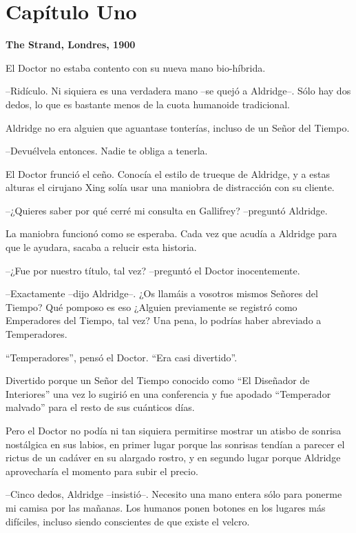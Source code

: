 \chapter*{Capítulo Uno}

\textbf{\large{The Strand, Londres, 1900}}

\mbox{}

El Doctor no estaba contento con su nueva mano bio-híbrida.

--Ridículo. Ni siquiera es una verdadera mano --se quejó a Aldridge--. Sólo hay dos dedos, lo que es bastante menos de la cuota humanoide tradicional.

Aldridge no era alguien que aguantase tonterías, incluso de un Señor del Tiempo.

--Devuélvela entonces. Nadie te obliga a tenerla.

El Doctor frunció el ceño. Conocía el estilo de trueque de Aldridge, y a estas alturas el cirujano Xing solía usar una maniobra de distracción con su cliente. 

--¿Quieres saber por qué cerré mi consulta en Gallifrey? --preguntó Aldridge.

La maniobra funcionó como se esperaba. Cada vez que acudía a Aldridge para que le ayudara, sacaba a relucir esta historia.

--¿Fue por nuestro título, tal vez? --preguntó el Doctor inocentemente.

--Exactamente --dijo Aldridge--. ¿Os llamáis a vosotros mismos Señores del Tiempo? Qué pomposo es eso ¿Alguien previamente se registró como Emperadores del Tiempo, tal vez? Una pena, lo podrías haber abreviado a Temperadores.

``Temperadores'', pensó el Doctor. ``Era casi divertido''.

Divertido porque un Señor del Tiempo conocido como ``El Diseñador de Interiores'' una vez lo sugirió en una conferencia y fue apodado ``Temperador malvado'' para el resto de sus cuánticos días.

Pero el Doctor no podía ni tan siquiera permitirse mostrar un atisbo de sonrisa nostálgica en sus labios, en primer lugar porque las sonrisas tendían a parecer el rictus de un cadáver en su alargado  rostro, y en segundo lugar porque Aldridge aprovecharía el momento para subir el precio.

--Cinco dedos, Aldridge --insistió--. Necesito una mano entera sólo para ponerme mi camisa por las mañanas. Los humanos ponen botones en los lugares más difíciles, incluso siendo conscientes de que existe el velcro. 

